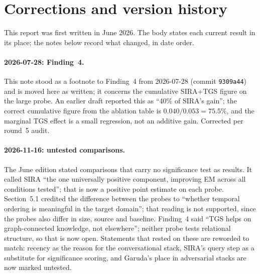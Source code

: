 \documentclass[11pt,a4paper]{article}
\begin{document}
\section*{Corrections and version history}

This report was first written in June 2026. The body states each current result in its place; the notes below record what changed, in date order.

\paragraph{2026-07-28: Finding~4.} This note stood as a footnote to Finding~4 from 2026-07-28 (commit \texttt{9309a44}) and is moved here as written; it concerns the cumulative SIRA+TGS figure on the large probe. An earlier draft reported this as ``40\% of SIRA's gain''; the correct cumulative figure from the ablation table is $0.040/0.053 = 75.5\%$, and the marginal TGS effect is a small regression, not an additive gain. Corrected per round~5 audit.

\paragraph{2026-11-16: untested comparisons.} The June edition stated comparisons that carry no significance test as results. It called SIRA ``the one universally positive component, improving EM across all conditions tested''; that is now a positive point estimate on each probe. Section~5.1 credited the difference between the probes to ``whether temporal ordering is meaningful in the target domain''; that reading is not supported, since the probes also differ in size, source and baseline. Finding~4 said ``TGS helps on graph-connected knowledge, not elsewhere''; neither probe tests relational structure, so that is now open. Statements that rested on these are reworded to match: recency as the reason for the conversational stack, SIRA's query step as a substitute for significance scoring, and Garuda's place in adversarial stacks are now marked untested.
\end{document}
